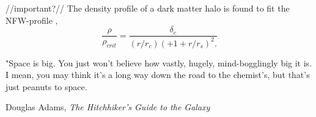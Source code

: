 //important?//
The density profile of a dark matter halo is found to fit the NFW-profile \parencite{Navarro1996},
\begin{equation}
    \frac{\rho}{\rho_{crit}} = \frac{\delta_c}{(r/r_c)(+1+r/r_s)^2.}
\end{equation}

\epigraph{"Space is big. You just won't believe how vastly, hugely, mind-bogglingly big it is. I mean, you may think it's a long way down the road to the chemist's, but that's just peanuts to space.}{Douglas Adams, \textit{The Hitchhiker's Guide to the Galaxy}}
